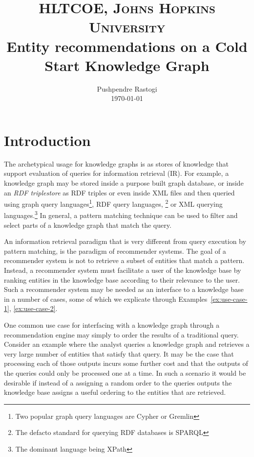 \documentclass[paper=a4,fontsize=11pt]{scrartcl}
\title{
  \vspace{-1in}
  \usefont{OT1}{bch}{b}{n}
  \normalfont\normalsize\textsc{HLTCOE, Johns Hopkins University}\\
  \huge Entity recommendations on a Cold Start Knowledge Graph\\
}
\author{
  \normalfont\normalsize
  Pushpendre Rastogi\\
  [-3pt]\normalsize\today%
}
\date{}
\numberwithin{equation}{section}    %
\numberwithin{figure}{section}      %
\numberwithin{table}{section}       %
\begin{document}
\maketitle
\section{Introduction}
\label{sec:introduction}
The archetypical usage for knowledge graphs is as stores of knowledge that
support evaluation of queries for information retrieval (IR). For example, a
knowledge graph may be stored inside a purpose built graph database, or inside
an \textit{RDF triplestore} as RDF triples or even inside XML files and then
queried using graph query languages\footnote{Two popular graph query languages
are Cypher or Gremlin}, RDF query languages, \footnote{The defacto standard for
querying RDF databases is SPARQL} or XML querying languages.\footnote{The
dominant language being XPath} In general, a pattern matching technique can be
used to filter and select parts of a knowledge graph that match the query.

An information retrieval paradigm that is very different from query execution by
pattern matching, is the paradigm of recommender systems. The goal of a recommender
system is not to retrieve a subset of entities that match a pattern. Instead,
a recommender system must facilitate a user of the knowledge base
by ranking entities in the knowledge base according to their relevance to the user.
Such a recommender system may be needed as an interface to a knowledge base in a number
of cases, some of which we explicate through Examples~\ref{ex:use-case-1},
\ref{ex:use-case-2}.

\begin{example}\label{ex:use-case-1}
  One common use case for interfacing with a knowledge graph through a recommendation
engine may simply to order the results of a traditional query. Consider
an example where the analyst queries a knowledge graph and retrieves
a very large number of entities that satisfy that query. It may be the case that
processing each of those outputs incurs some further cost and that the outputs
of the queries could only be processed one at a time. In such a scenario it would
be desirable if instead of a assigning a random order to the queries outputs the
knowledge base assigns a useful ordering to the entities that are retrieved.
\end{example}
\end{document}
